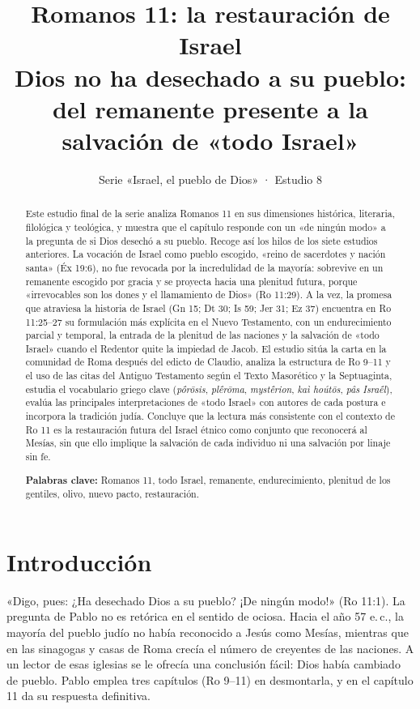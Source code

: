\documentclass[11pt,letterpaper]{article}
\title{\color{ladrillo}\bfseries Romanos 11: la restauración de Israel\\[4pt]\large\color{cafe}\mdseries Dios no ha desechado a su pueblo: del remanente presente a la salvación de «todo Israel»}
\author{}\date{\color{sepia}Serie «Israel, el pueblo de Dios» · Estudio 8}
\begin{document}
\maketitle\thispagestyle{empty}

\begin{abstract}\noindent
Este estudio final de la serie analiza Romanos 11 en sus dimensiones histórica, literaria, filológica y teológica, y muestra que el capítulo responde con un «de ningún modo» a la pregunta de si Dios desechó a su pueblo. Recoge así los hilos de los siete estudios anteriores. La vocación de Israel como pueblo escogido, «reino de sacerdotes y nación santa» (Éx 19:6), no fue revocada por la incredulidad de la mayoría: sobrevive en un remanente escogido por gracia y se proyecta hacia una plenitud futura, porque «irrevocables son los dones y el llamamiento de Dios» (Ro 11:29). A la vez, la promesa que atraviesa la historia de Israel (Gn 15; Dt 30; Is 59; Jer 31; Ez 37) encuentra en Ro 11:25--27 su formulación más explícita en el Nuevo Testamento, con un endurecimiento parcial y temporal, la entrada de la plenitud de las naciones y la salvación de «todo Israel» cuando el Redentor quite la impiedad de Jacob. El estudio sitúa la carta en la comunidad de Roma después del edicto de Claudio, analiza la estructura de Ro 9--11 y el uso de las citas del Antiguo Testamento según el Texto Masorético y la Septuaginta, estudia el vocabulario griego clave (\emph{pṓrōsis}, \emph{plḗrōma}, \emph{mystḗrion}, \emph{kaì hoútōs}, \emph{pâs Israḗl}), evalúa las principales interpretaciones de «todo Israel» con autores de cada postura e incorpora la tradición judía. Concluye que la lectura más consistente con el contexto de Ro 11 es la restauración futura del Israel étnico como conjunto que reconocerá al Mesías, sin que ello implique la salvación de cada individuo ni una salvación por linaje sin fe.
\par\smallskip\noindent\textbf{Palabras clave:} Romanos 11, todo Israel, remanente, endurecimiento, plenitud de los gentiles, olivo, nuevo pacto, restauración.
\end{abstract}

\section{Introducción}

«Digo, pues: ¿Ha desechado Dios a su pueblo? ¡De ningún modo!» (Ro 11:1). La pregunta de Pablo no es retórica en el sentido de ociosa. Hacia el año 57 e.\,c., la mayoría del pueblo judío no había reconocido a Jesús como Mesías, mientras que en las sinagogas y casas de Roma crecía el número de creyentes de las naciones. A un lector de esas iglesias se le ofrecía una conclusión fácil: Dios había cambiado de pueblo. Pablo emplea tres capítulos (Ro 9--11) en desmontarla, y en el capítulo 11 da su respuesta definitiva.
\end{document}
